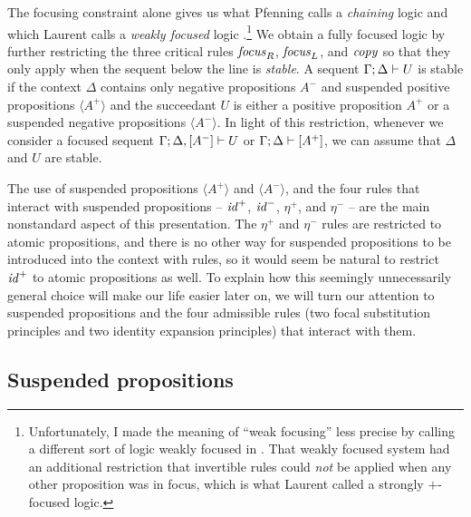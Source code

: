 The focusing constraint alone
gives us what Pfenning calls a {\it chaining} logic
\cite{pfenning12chaining} and which Laurent calls a {\it weakly
  focused} logic \cite{laurent04proof}.\footnote{Unfortunately,
  I made the meaning of ``weak focusing'' less precise by calling
  a different sort of logic weakly focused  in \cite{simmons09weak}. 
  That weakly
  focused system had an additional restriction that invertible rules
  could {\it not} be applied when any other proposition was in focus, which
  is what Laurent called a strongly $+$-focused logic.}
We obtain a fully focused logic by further restricting the three
critical rules ${\it focus}_R$, ${\it
  focus}_L$, and ${\it copy}$ 
so that they only apply when the sequent below the line is {\it
  stable}.  A sequent ${\Gamma};{\Delta} \vdash {U} \mathstrut$ is stable if the
context $\Delta$ contains only negative propositions $A^-$ and
suspended positive propositions $\langle A^+ \rangle$ and the
succeedant $U$ is either a positive proposition $A^+$ or a suspended
negative propositions $\langle A^- \rangle$. In light of this restriction,
whenever we consider a focused sequent
${\Gamma};{\Delta, [A^-]} \vdash {U} \mathstrut$ or 
${\Gamma};{\Delta} \vdash {[A^+]} \mathstrut$, we can assume that $\Delta$ and $U$ 
are stable.

The use of suspended propositions $\langle A^+ \rangle$ and $\langle
A^- \rangle$, and the four rules that interact with suspended
propositions -- ${\it id}^+$, ${\it id}^-$, $\eta^+$, and $\eta^-$ --
are the main nonstandard aspect of this presentation.  The $\eta^+$
and $\eta^-$ rules are restricted to atomic propositions, and there is
no other way for suspended propositions to be introduced into the
context with rules, so it would seem be natural to restrict ${\it
  id}^+$ to atomic propositions as well. To explain how this seemingly
unnecessarily general choice will make our life easier later
on, we will turn our attention to suspended
propositions and the four admissible rules (two focal substitution
principles and two identity expansion principles) that interact with
them.

\subsection{Suspended propositions}
\label{sec:lin-suspended}

